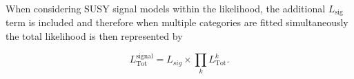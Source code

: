 When considering \ac{SUSY} signal models within the likelihood, the additional $L_{\text{sig}}$ term is included and therefore when multiple categories are fitted simultaneously the total likelihood is then represented by 

\begin{equation}
L^{\text{signal}}_{\text{Tot}} =  L_{sig} \times \prod_{k} L^{k}_{\text{Tot}}.
\end{equation}
